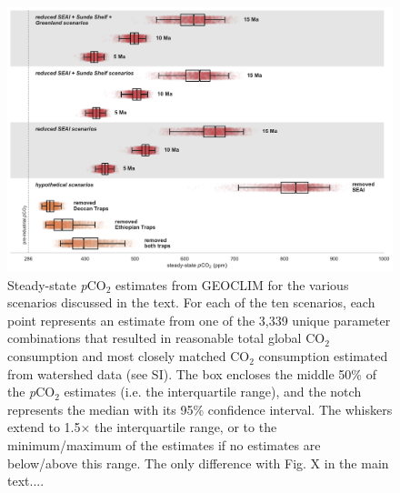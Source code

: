 \documentclass[11pt,letterpaper]{article}
\newcommand{\pCOtwo}{\textit{p}CO$_{2}$\xspace}
\newcommand{\COtwo}{CO$_{2}$\xspace}
\begin{document}
\begin{figure}[h!]
    \centering
    \includegraphics[width=1\textwidth]{Manuscript/Figures/scenario_pCO2_all.pdf}
    \caption{Steady-state \pCOtwo estimates from GEOCLIM for the various scenarios discussed in the text. For each of the ten scenarios, each point represents an estimate from one of the 3,339 unique parameter combinations that resulted in reasonable total global \COtwo consumption and most closely matched \COtwo consumption estimated from watershed data (see SI). The box encloses the middle 50\% of the \pCOtwo estimates (i.e. the interquartile range), and the notch represents the median with its 95\% confidence interval. The whiskers extend to 1.5$\times$ the interquartile range, or to the minimum/maximum of the estimates if no estimates are below/above this range. The only difference with Fig. X in the main text....}
    \label{fig:scenario_pCO2_all}
\end{figure}
\end{document}
